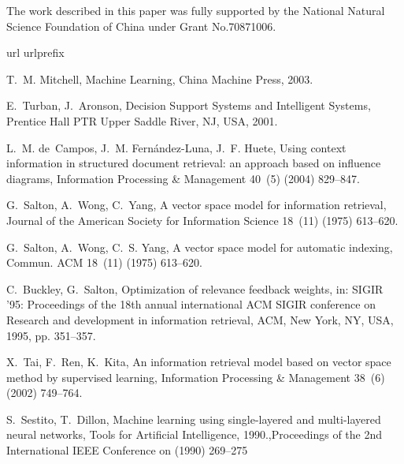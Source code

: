 \documentclass{elsart}
\begin{document}
The work described in this paper was fully supported by the National Natural
Science Foundation of China under Grant No.70871006.




%

\begin{thebibliography}{10}
\expandafter\ifx\csname url\endcsname\relax
  \def\url#1{\texttt{#1}}\fi
\expandafter\ifx\csname urlprefix\endcsname\relax\def\urlprefix{URL }\fi

T.~M. Mitchell, Machine Learning, China Machine Press, 2003.

E.~Turban, J.~Aronson, Decision Support Systems and Intelligent Systems,
  Prentice Hall PTR Upper Saddle River, NJ, USA, 2001.

L.~M. de~Campos, J.~M. Fern{\'a}ndez-Luna, J.~F. Huete,
  {Using context information in structured document
  retrieval: an approach based on influence diagrams}, Information Processing
  \& Management 40~(5) (2004) 829--847.


G.~Salton, A.~Wong, C.~Yang, A vector space model for information retrieval,
  Journal of the American Society for Information Science 18~(11) (1975)
  613--620.

G.~Salton, A.~Wong, C.~S. Yang, A vector space model for automatic indexing,
  Commun. ACM 18~(11) (1975) 613--620.

C.~Buckley, G.~Salton, Optimization of relevance feedback weights, in: SIGIR
  '95: Proceedings of the 18th annual international ACM SIGIR conference on
  Research and development in information retrieval, ACM, New York, NY, USA,
  1995, pp. 351--357.


X.~Tai, F.~Ren, K.~Kita,
 {An information retrieval model based on vector space
  method by supervised learning}, Information Processing \& Management 38~(6)
  (2002) 749--764.

S.~Sestito, T.~Dillon, Machine learning using single-layered and multi-layered
  neural networks, Tools for Artificial Intelligence, 1990.,Proceedings of the
  2nd International IEEE Conference on (1990) 269--275
 

\end{thebibliography}
\end{document}
